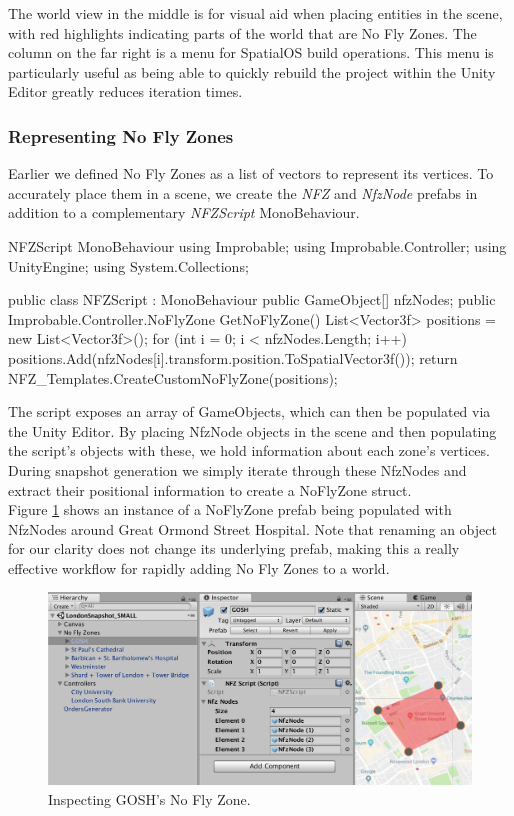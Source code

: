 \documentclass[a4paper,12pt,titlepage]{article}
\begin{document}
The world view in the middle is for visual aid when placing entities in the scene, with red highlights indicating parts of the world that are No Fly Zones. The column on the far right is a menu for SpatialOS build operations. This menu is particularly useful as being able to quickly rebuild the project within the Unity Editor greatly reduces iteration times.

\subsubsection{Representing No Fly Zones}
Earlier we defined No Fly Zones as a list of vectors to represent its vertices. To accurately place them in a scene, we create the \textit{NFZ} and \textit{NfzNode} prefabs in addition to a complementary \textit{NFZScript} MonoBehaviour.

\begin{sexylisting}[colback=white]{NFZScript MonoBehaviour}
using Improbable;
using Improbable.Controller;
using UnityEngine;
using System.Collections;

public class NFZScript : MonoBehaviour
{
  public GameObject[] nfzNodes;
  public Improbable.Controller.NoFlyZone GetNoFlyZone()
  {
    List<Vector3f> positions = new List<Vector3f>();
    for (int i = 0; i < nfzNodes.Length; i++)
    {
      positions.Add(nfzNodes[i].transform.position.ToSpatialVector3f());
    }
    return NFZ_Templates.CreateCustomNoFlyZone(positions);
  }
}
\end{sexylisting}

The script exposes an array of GameObjects, which can then be populated via the Unity Editor. By placing NfzNode objects in the scene and then populating the script's objects with these, we hold information about each zone's vertices. During snapshot generation we simply iterate through these NfzNodes and extract their positional information to create a NoFlyZone struct.\\

Figure \ref{fig:nfz_representation_example} shows an instance of a NoFlyZone prefab being populated with NfzNodes around Great Ormond Street Hospital. Note that renaming an object for our clarity does not change its underlying prefab, making this a really effective workflow for rapidly adding No Fly Zones to a world.

\begin{figure}[!hbpt]
  \center
  \includegraphics[width=\linewidth]{img/nfz_representation_example.png}
  \caption{Inspecting GOSH's No Fly Zone.}
  \label{fig:nfz_representation_example}
\end{figure}
\end{document}
